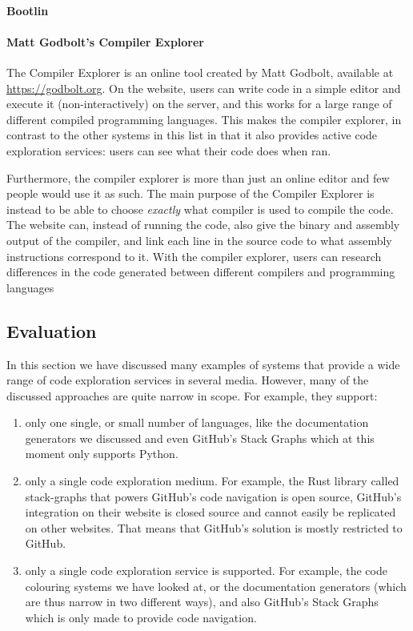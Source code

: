 \paragraph{Bootlin}


\paragraph{Matt Godbolt's Compiler Explorer}
The Compiler Explorer is an online tool created by Matt Godbolt, available at \url{https://godbolt.org}.
On the website, users can write code in a simple editor and execute it (non-interactively) on the server, and this works for a large range of different compiled programming languages.
This makes the compiler explorer, in contrast to the other systems in this list in that it also provides active code exploration services: users can see what their code does when ran.

Furthermore, the compiler explorer is more than just an online editor and few people would use it as such.
The main purpose of the Compiler Explorer is instead to be able to choose \emph{exactly} what compiler is used to compile the code.
The website can, instead of running the code, also give the binary and assembly output of the compiler, and link each line in the source code to what assembly instructions correspond to it.
With the compiler explorer, users can research differences in the code generated between different compilers and programming languages

\subsection{Evaluation}\label{subsec:evaluation}

In this section we have discussed many examples of systems that provide a wide range of code exploration services in several media.
However, many of the discussed approaches are quite narrow in scope.
For example, they support:
\begin{enumerate}
    \item only one single, or small number of languages, like the documentation generators we discussed and even GitHub's Stack Graphs which at this moment only supports Python.
    \item only a single code exploration medium.
    For example, the Rust library called stack-graphs that powers GitHub's code navigation is open source, GitHub's integration on their website is closed source and cannot easily be replicated on other websites.
    That means that GitHub's solution is mostly restricted to GitHub.
    \item only a single code exploration service is supported.
    For example, the code colouring systems we have looked at, or the documentation generators (which are thus narrow in two different ways), and also GitHub's Stack Graphs which is only made to provide code navigation.
\end{enumerate}

